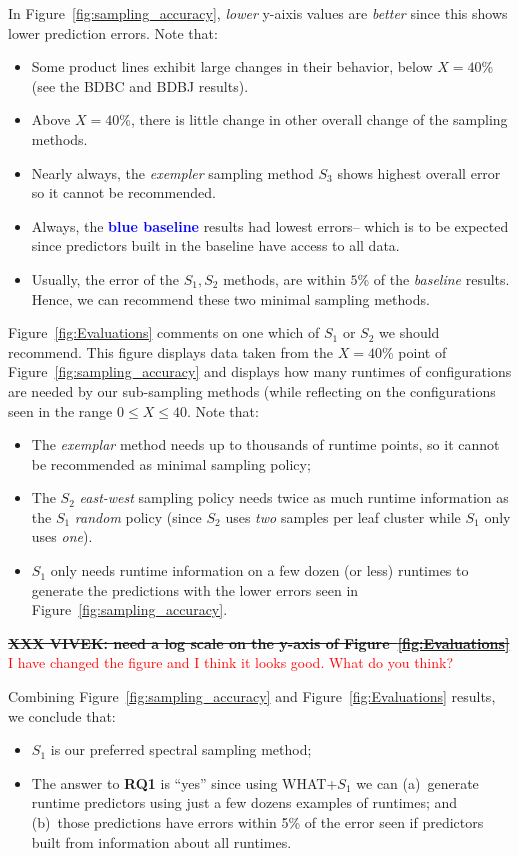 \documentclass{sig-alternative}
\newcommand{\bi}{\begin{itemize}}%
\newcommand{\ei}{\end{itemize}}
\newcommand{\fig}[1]{Figure~\ref{fig:#1}}
\begin{document}
In  \fig{sampling_accuracy}, {\em lower} y-aixis values are {\em better} since this shows lower
prediction errors. Note that:
\bi
\item Some product lines exhibit large changes in their behavior, below $X=40$\% (see the BDBC and BDBJ
results).
\item Above $X=40$\%, there is little change in other overall change of the sampling methods.
\item
Nearly always, the {\em exempler} sampling method $S_3$ shows  highest overall error so it cannot be recommended.
\item Always, the  \textcolor{blue}{{\bf blue baseline}} results  had lowest errors-- which is to be
expected since predictors built in the baseline have access to all data.
\item
Usually, the error of the $S_1,S_2$ methods, are within $5$\% of the {\em baseline} results.
Hence, we can recommend these two minimal sampling methods.
\ei
\fig{Evaluations} comments on one which  of    $S_1$ or $S_2$ we should recommend.
This figure displays data taken from the $X=40$\% point of \fig{sampling_accuracy} and displays
how many runtimes of configurations are needed by our sub-sampling methods (while
reflecting on the configurations seen in the range $0\le X \le 40$. Note that:
\bi
\item
The {\em exemplar}
method needs up to thousands of runtime points, so it cannot be recommended as  minimal sampling
policy;
\item The $S_2$ {\em east-west} sampling policy needs twice as much runtime information as 
the $S_1$ {\em random} policy (since $S_2$ uses {\em two} samples per leaf cluster  while
$S_1$ only uses {\em one}).
\item $S_1$ only needs runtime information on a few dozen (or less) runtimes to generate
the predictions with the lower errors seen in \fig{sampling_accuracy}.
\ei
\st{\bf XXX VIVEK: need a log scale on the y-axis of \fig{Evaluations} } \textcolor{red}{I have changed the figure and I think it looks good. What do you think?}

Combining \fig{sampling_accuracy} and \fig{Evaluations} results, we conclude that:
\bi
\item
$S_1$ is our preferred spectral sampling method;
\item
The answer to {\bf RQ1} is ``yes'' since using WHAT+$S_1$ we can (a)~generate runtime predictors
using just a few dozens examples of runtimes; and (b)~those predictions have errors
within 5\% of the error seen if predictors built from information about all runtimes.
\ei
\end{document}
